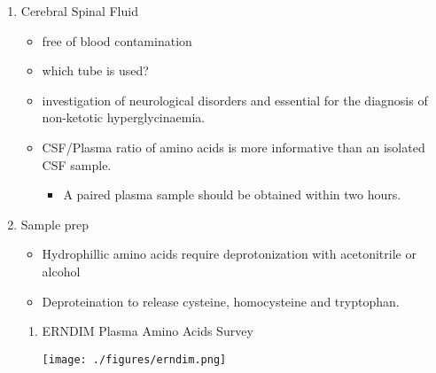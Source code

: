 \documentclass{scrartcl}
\begin{document}
\begin{enumerate}
\item Cerebral Spinal Fluid
\label{sec:orgedd0258}
\begin{itemize}
\item free of blood contamination
\item which tube is used?
\item investigation of neurological disorders and essential for the
diagnosis of non-ketotic hyperglycinaemia.
\item CSF/Plasma ratio of amino acids is more informative than an isolated CSF sample.
\begin{itemize}
\item A paired plasma sample should be obtained within two hours.
\end{itemize}
\end{itemize}
\item Sample prep
\label{sec:orgf99fa6a}
\begin{itemize}
\item Hydrophillic amino acids require deprotonization with acetonitrile or alcohol
\item Deproteination to release cysteine, homocysteine and tryptophan.
\end{itemize}

\begin{enumerate}
\item ERNDIM Plasma Amino Acids Survey
\label{sec:org593644d}

\begin{center}
\texttt{[image: ./figures/erndim.png]}
\end{center}
\end{enumerate}
\end{enumerate}
\end{document}
